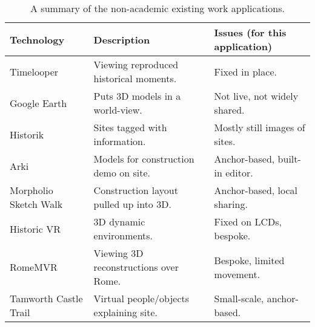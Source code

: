 \documentclass[12pt, a4paper]{article}
\begin{document}
\begin{table}[]
\footnotesize
\begin{tabular}{|l|l|l|}
\hline
\rowcolor[HTML]{EFEFEF} 
\textbf{Technology}   & \textbf{Description}                    & \textbf{Issues (for this application)} \\ \hline
Timelooper \cite{existing:timelooper}     & Viewing reproduced historical moments.  & Fixed in place.                        \\ \hline
Google Earth \cite{existing:googleearth}   & Puts 3D models in a world-view.         & Not live, not widely shared.     \\ \hline
Historik \cite{existing:historik}       & Sites tagged with information.          & Mostly still images of sites.          \\ \hline
Arki \cite{existing:arki}           & Models for construction demo on site.   & Anchor-based, built-in editor.      \\ \hline
Morpholio Sketch Walk \cite{existing:morpholio} & Construction layout pulled up into 3D.  & Anchor-based, local sharing.      \\ \hline
Historic VR \cite{existing:historicvr}          & 3D dynamic environments.                & Fixed on LCDs, bespoke.      \\ \hline
RomeMVR \cite{existing:romemvr}              & Viewing 3D reconstructions over Rome.   & Bespoke, limited movement.             \\ \hline
Tamworth Castle Trail \cite{existing:tamworth} & Virtual people/objects explaining site. & Small-scale, anchor-based.             \\ \hline
\end{tabular}
\caption{A summary of the non-academic existing work applications.}
\label{table:existingwork}
\end{table}
\end{document}
